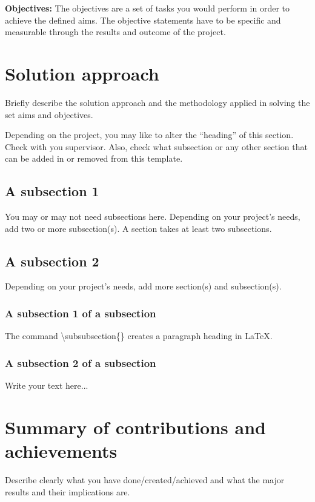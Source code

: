 \textbf{Objectives:} The objectives are a set of tasks you would perform in order to achieve the defined aims. The objective statements have to be specific and measurable through the results and outcome of the project.



\section{Solution approach}
\label{sec:intro_sol} %
Briefly describe the solution approach and the methodology applied in solving the set aims and objectives.

Depending on the project, you may like to alter the ``heading'' of this section. Check with you supervisor. Also, check what subsection or any other section that can be added in or removed from this template.

\subsection{A subsection 1}
\label{sec:intro_some_sub1}
You may or may not need subsections here. Depending on your project's needs, add two or more subsection(s). A section takes at least two subsections. 

\subsection{A subsection 2}
\label{sec:intro_some_sub2}
Depending on your project's needs, add more section(s) and subsection(s).

\subsubsection{A subsection 1 of a subsection}
\label{sec:intro_some_subsub1}
The command \textbackslash subsubsection\{\} creates a paragraph heading in \LaTeX.

\subsubsection{A subsection 2 of a subsection}
\label{sec:intro_some_subsub2}
Write your text here...

\section{Summary of contributions and achievements} %
\label{sec:intro_sum_results} %
Describe clearly what you have done/created/achieved and what the major results and their implications are. 


